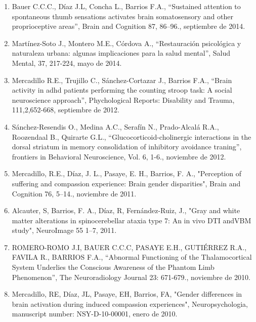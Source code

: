 \begin{enumerate}
55. Donnet S., Bartolo R., Fernández J.M., Silva Cunha J.P., Prado L., and Merchant H., “Monkeys time their pauses of 
movement and not their movement-kinematics during a synchronization continuation rhythmic task", J. Neurophysiol 111: 
2138–2149.,    septiembre de 2014.

\item Bauer C.C.C., Díaz J.L, Concha L., Barrios F.A., “Sustained attention to spontaneous thumb sensations activates brain 
somatosensory and other proprioceptive areas”, Brain and Cognition 87, 86–96.,    
septiembre de 2014.

\item Martínez-Soto J., Montero M.E., Córdova A., “Restauración psicológica y naturaleza urbana: algunas implicaciones para 
la 
salud mental”, Salud Mental, 37, 217-224,    mayo de 2014.

\item Mercadillo R.E., Trujillo C., Sánchez-Cortazar J., Barrios F.A., “Brain activity in adhd patients performing the 
counting 
stroop task: A social neuroscience approach”, Phychological Reports: Disability and Trauma, 111,2,652-668, septiembre de 2012.

\item Sánchez-Resendis O., Medina A.C., Serafín N., Prado-Alcalá R.A., Roozendaal B., Quirarte G.L., 
“Glucocorticoid-cholinergic interactions in the dorsal striatum in memory consolidation of inhibitory avoidance traning”, 
frontiers in Behavioral Neuroscience, Vol. 6, 1-6.,    noviembre de 2012.

\item Mercadillo, R.E., Díaz, J. L., Pasaye, E. H., Barrios, F. A., "Perception of suffering and compassion experience: Brain 
gender disparities", Brain and Cognition 76, 5–14.,    noviembre de 2011.

\item Alcauter, S, Barrios, F. A., Díaz, R, Fernández-Ruiz, J., "Gray and white matter alterations in spinocerebellar ataxia 
type 7: An in vivo DTI andVBM study", NeuroImage 55 1–7,    2011.

\item ROMERO-ROMO J.I, BAUER C.C.C, PASAYE E.H., GUTIÉRREZ R.A., FAVILA R., BARRIOS F.A., “Abnormal Functioning of the 
Thalamocortical System Underlies the Conscious Awareness of the Phantom Limb Phenomenon”, The Neuroradiology Journal 23: 
671-679.,    noviembre de 2010.

\item Mercadillo, RE, Díaz, JL, Pasaye, EH, Barrios, FA, "Gender differences in brain activation during induced compassion 
experiences", Neuropsychologia, manuscript number: NSY-D-10-00001,    enero de 2010.


\end{enumerate}
